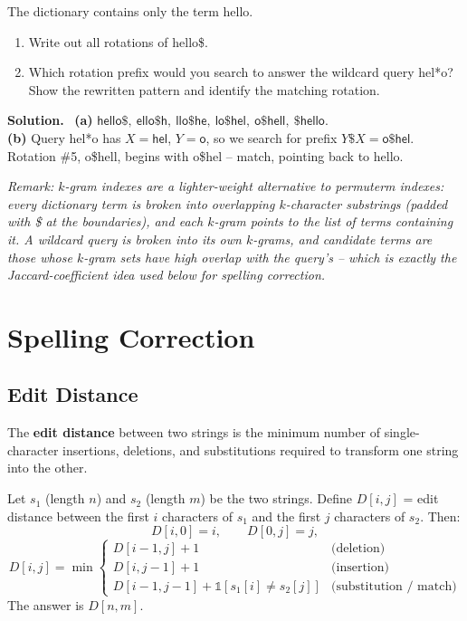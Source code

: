 \documentclass[11pt, a4paper]{article}
\newcommand{\Solution}{\medskip\noindent\textbf{\color{exgreen}Solution.}\ }
\newcommand{\Note}[1]{\par\noindent\textit{\color{darkgray}Remark: #1}\par}
\begin{document}
\begin{exercisebox}
The dictionary contains only the term \textsf{hello}.
\begin{enumerate}[label=(\alph*)]
  \item Write out all rotations of \textsf{hello\$}.
  \item Which rotation prefix would you search to answer the wildcard query \textsf{hel*o}? Show the rewritten pattern and identify the matching rotation.
\end{enumerate}
\end{exercisebox}

\Solution
\textbf{(a)} $\textsf{hello\$},\ \textsf{ello\$h},\ \textsf{llo\$he},\ \textsf{lo\$hel},\ \textsf{o\$hell},\ \textsf{\$hello}$.\\
\textbf{(b)} Query \textsf{hel*o} has $X=\textsf{hel}$, $Y=\textsf{o}$, so we search for prefix $Y\$X=\textsf{o\$hel}$. Rotation \#5, \textsf{o\$hell}, begins with \textsf{o\$hel} -- match, pointing back to \textsf{hello}.

\Note{$k$-gram indexes are a lighter-weight alternative to permuterm indexes: every dictionary term is broken into overlapping $k$-character substrings (padded with \$ at the boundaries), and each $k$-gram points to the list of terms containing it. A wildcard query is broken into its own $k$-grams, and candidate terms are those whose $k$-gram sets have high overlap with the query's -- which is exactly the Jaccard-coefficient idea used below for spelling correction.}

\section{Spelling Correction}

\subsection{Edit Distance}

\begin{defbox}
The \textbf{edit distance} between two strings is the minimum number of single-character insertions, deletions, and substitutions required to transform one string into the other.
\end{defbox}

\begin{formulabox}
Let $s_1$ (length $n$) and $s_2$ (length $m$) be the two strings. Define $D[i,j]$ = edit distance between the first $i$ characters of $s_1$ and the first $j$ characters of $s_2$. Then:
\[
D[i,0] = i, \qquad D[0,j] = j,
\]
\[
D[i,j] = \min \begin{cases}
D[i-1,j] + 1 & \text{(deletion)} \\
D[i,j-1] + 1 & \text{(insertion)} \\
D[i-1,j-1] + \mathbb{1}[s_1[i]\ne s_2[j]] & \text{(substitution / match)}
\end{cases}
\]
The answer is $D[n,m]$.
\end{formulabox}
\end{document}

